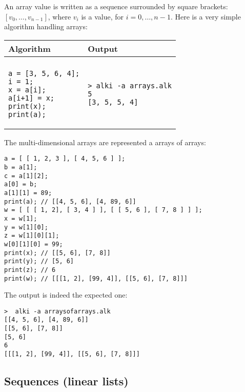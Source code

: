 \documentclass[a4paper]{report}
\begin{document}
An array value is written as a sequence surrounded by square brackets: $[v_0,\ldots,v_{n-1}]$, where $v_i$ is a value, for $i=0,\ldots,n-1$.
Here is a very simple algorithm handling arrays:
\begin{center}
\begin{tabular}{ll}
Algorithm & Output\\
\hline
\\
\begin{minipage}{.35\textwidth}
\begin{verbatim}
a = [3, 5, 6, 4];
i = 1;
x = a[i];
a[i+1] = x;
print(x);
print(a);
\end{verbatim}
\end{minipage}
&
\begin{minipage}{.3\textwidth}
\begin{verbatim}
> alki -a arrays.alk
5
[3, 5, 5, 4]
\end{verbatim}
\end{minipage}
\end{tabular}
\end{center}
The multi-dimensional arrays are represented a arrays of arrays:
\begin{verbatim}
a = [ [ 1, 2, 3 ], [ 4, 5, 6 ] ]; 
b = a[1];
c = a[1][2];
a[0] = b;
a[1][1] = 89;
print(a); // [[4, 5, 6], [4, 89, 6]]
w = [ [ [ 1, 2], [ 3, 4 ] ], [ [ 5, 6 ], [ 7, 8 ] ] ];
x = w[1];
y = w[1][0];
z = w[1][0][1];
w[0][1][0] = 99;
print(x); // [[5, 6], [7, 8]]
print(y); // [5, 6]
print(z); // 6
print(w); // [[[1, 2], [99, 4]], [[5, 6], [7, 8]]]
\end{verbatim}
The output is indeed the expected one:
\begin{verbatim}
>  alki -a arraysofarrays.alk
[[4, 5, 6], [4, 89, 6]]
[[5, 6], [7, 8]]
[5, 6]
6
[[[1, 2], [99, 4]], [[5, 6], [7, 8]]]
\end{verbatim}

\subsection{Sequences (linear lists)}
\end{document}
